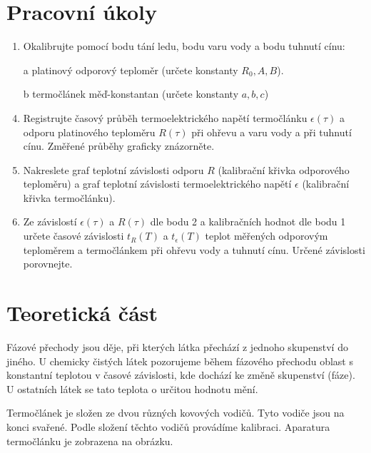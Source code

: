 \section{Pracovní úkoly}

\begin{enumerate}
\item Okalibrujte pomocí bodu tání ledu, bodu varu vody a bodu tuhnutí cínu:
\item[a] platinový odporový teploměr (určete konstanty $R_0, A, B$).
\item[b] termočlánek měď-konstantan (určete konstanty $a, b, c$)

\item Registrujte časový průběh termoelektrického napětí termočlánku $\epsilon(\tau)$ a odporu platinového teploměru $R(\tau)$ při ohřevu a varu vody a při tuhnutí cínu. Změřené průběhy graficky znázorněte.

\item Nakreslete graf teplotní závislosti odporu $R$ (kalibrační křivka odporového teploměru) a graf teplotní závislosti termoelektrického napětí $\epsilon$ (kalibrační křivka termočlánku).

\item Ze závislostí $\epsilon(\tau)$ a $R(\tau)$ dle bodu 2 a kalibračních hodnot dle bodu 1 určete časové závislosti $t_R(T)$ a $t_\epsilon(T)$ teplot měřených odporovým teploměrem a termočlánkem při ohřevu vody a tuhnutí cínu. Určené závislosti porovnejte.

\end{enumerate}

\section{Teoretická část}
Fázové přechody jsou děje, při kterých látka přechází z jednoho skupenství do jiného. U chemicky čistých látek pozorujeme během fázového přechodu oblast s konstantní teplotou v časové závislosti, kde dochází ke změně skupenství (fáze). U ostatních látek se tato teplota o určitou hodnotu mění.

Termočlánek je složen ze dvou různých kovových vodičů. Tyto vodiče jsou na konci svařené. Podle složení těchto vodičů provádíme kalibraci. Aparatura termočlánku je zobrazena na obrázku.




